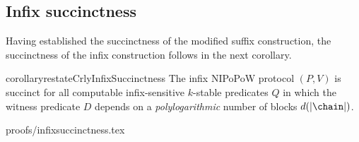%
%
%
%
%

\subsection{Infix succinctness}
Having established the succinctness of the modified suffix construction, the
succinctness of the infix construction follows in the next corollary.

\begin{restatable}{corollary}{restateCrlyInfixSuccinctness}
\label{thm.infix-succinctness}
The infix NIPoPoW protocol $(P, V)$ is succinct for all computable
infix-sensitive $k$-stable predicates $Q$ in which the witness predicate $D$
depends on a \emph{polylogarithmic} number of blocks $d(|\chain|)$.
\end{restatable}
{proofs/infixsuccinctness.tex}
